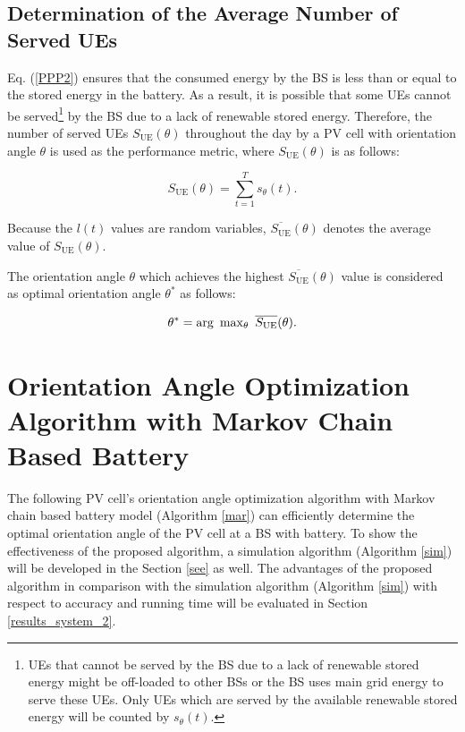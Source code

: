 \subsection{Determination of the Average Number of Served UEs}
Eq. (\ref{PPP2}) ensures that the consumed energy by the BS is less than or equal to the stored energy in the battery. As a result, it is possible that some UEs cannot be served\footnote{UEs that cannot be served by the BS due to a lack of renewable stored energy might be off-loaded to other BSs or the BS uses main grid energy to serve these UEs. Only UEs which are served by the available renewable stored energy will be counted by $s_\theta(t)$.} by the BS due to a lack of renewable stored energy. Therefore, the number of served UEs $S_{\mathrm{UE}}(\theta)$ throughout the day by a PV cell with orientation angle $\theta$ is used as the performance metric, where $S_{\mathrm{UE}}(\theta)$ is as follows:

\begin{equation}
\label{PPP}
S_{\mathrm{UE}}(\theta)=\sum_{t=1}^{T} s_\theta(t).
\end{equation}

Because the $l(t)$ values are random variables, $\overline{S_{\mathrm{UE}}}(\theta)$ denotes the average value of $S_{\mathrm{UE}}(\theta)$.



The orientation angle $\theta$ which achieves the highest $\overline{S_{\mathrm{UE}}}(\theta)$ value is considered as optimal orientation angle $\theta^*$ as follows:

\begin{equation}
\label{sol}
\theta^* =\mathrm{arg} \enskip \mathrm{max}_{\theta} \enskip\overline{S_{\mathrm{UE}}}(\theta).
\end{equation}





\section{Orientation Angle Optimization Algorithm with Markov Chain Based Battery\label{jj}}
The following PV cell's orientation angle optimization algorithm with Markov chain based battery model (Algorithm \ref{mar}) can efficiently determine the optimal orientation angle of the PV cell at a BS with battery. To show the effectiveness of the proposed algorithm, a simulation algorithm (Algorithm \ref{sim}) will be developed in the Section \ref{see} as well. The advantages of the proposed algorithm in comparison with the simulation algorithm (Algorithm \ref{sim}) with respect to accuracy and running time will be evaluated in Section \ref{results_system_2}.

